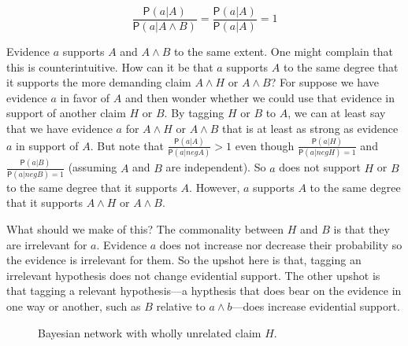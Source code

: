 \documentclass[
  10pt,
  dvipsnames,enabledeprecatedfontcommands]{scrartcl}
\newcommand{\pr}[1]{\mathsf{P}(#1)}
\begin{document}
\[\frac{\pr{a\vert A}}{\pr{a \vert A \wedge B}}=\frac{\pr{a \vert A}}{\pr{a \vert A}}=1\]

Evidence \(a\) supports \(A\) and \(A\wedge B\) to the same extent. One
might complain that this is counterintuitive. How can it be that \(a\)
supports \(A\) to the same degree that it supports the more demanding
claim \(A\wedge H\) or \(A\wedge B\)? For suppose we have evidence \(a\)
in favor of \(A\) and then wonder whether we could use that evidence in
support of another claim \(H\) or \(B\). By tagging \(H\) or \(B\) to
\(A\), we can at least say that we have evidence \(a\) for \(A\wedge H\)
or \(A\wedge B\) that is at least as strong as evidence \(a\) in support
of \(A\). But note that \(\frac{\pr{a \vert A}}{\pr{a\vert neg A}}>1\)
even though \(\frac{\pr{a \vert H}}{\pr{a\vert neg H}=1}\) and
\(\frac{\pr{a \vert B}}{\pr{a\vert neg B}=1}\) (assuming \(A\) and \(B\)
are independent). So \(a\) does not support \(H\) or \(B\) to the same
degree that it supports \(A\). However, \(a\) supports \(A\) to the same
degree that it supports \(A\wedge H\) or \(A\wedge B\).

What should we make of this? The commonality between \(H\) and \(B\) is
that they are irrelevant for \(a\). Evidence \(a\) does not increase nor
decrease their probability so the evidence is irrelevant for them. So
the upshot here is that, tagging an irrelevant hypothesis does not
change evidential support. The other upshot is that tagging a relevant
hypothesis---a hypthesis that does bear on the evidence in one way or
another, such as \(B\) relative to \(a\wedge b\)---does increase
evidential support.

\begin{center}
\begin{figure}[h!]

\caption{Bayesian network with wholly unrelated claim $H$.}
\label{network-unrelated}
\end{figure}
\end{center}
\end{document}
